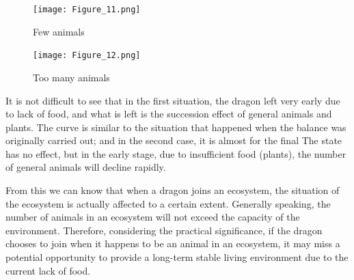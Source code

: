 \documentclass{mcmthesis}
\begin{document}
\begin{figure}[h]
    \centering
    \texttt{[image: Figure\_11.png]}
    \caption{Few animals}\label{fig:simulate9}
\end{figure}

\begin{figure}[h]
    \centering
    \texttt{[image: Figure\_12.png]}
    \caption{Too many animals}\label{fig:simulate10}
\end{figure}

It is not difficult to see that in the first situation, the dragon left very early due to lack of food, and what is left is the succession effect of general animals and plants. The curve is similar to the situation that happened when the balance was originally carried out; and in the second case, it is almost for the final The state has no effect, but in the early stage, due to insufficient food (plants), the number of general animals will decline rapidly.

From this we can know that when a dragon joins an ecosystem, the situation of the ecosystem is actually affected to a certain extent. Generally speaking, the number of animals in an ecosystem will not exceed the capacity of the environment. Therefore, considering the practical significance, if the dragon chooses to join when it happens to be an animal in an ecosystem, it may miss a potential opportunity to provide a long-term stable living environment due to the current lack of food. 
\end{document}
